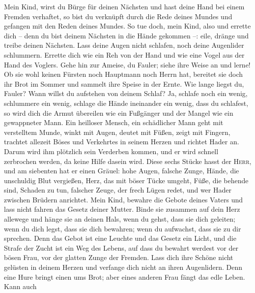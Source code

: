  Mein Kind, wirst du Bürge für deinen Nächsten und hast
deine Hand bei einem Fremden verhaftet,  so bist du
verknüpft durch die Rede deines Mundes und gefangen mit den Reden deines
Mundes.  So tue doch, mein Kind, also und errette dich --
denn du bist deinem Nächsten in die Hände gekommen --: eile, dränge und
treibe deinen Nächsten.  Lass deine Augen nicht schlafen,
noch deine Augenlider schlummern.  Errette dich wie ein
Reh von der Hand und wie eine Vogel aus der Hand des Voglers.
 Gehe hin zur Ameise, du Fauler; siehe ihre Weise an und
lerne!  Ob sie wohl keinen Fürsten noch Hauptmann noch
Herrn hat,  bereitet sie doch ihr Brot im Sommer und
sammelt ihre Speise in der Ernte.  Wie lange liegst du,
Fauler? Wann willst du aufstehen von deinem Schlaf?  Ja,
schlafe noch ein wenig, schlummere ein wenig, schlage die Hände
ineinander ein wenig, dass du schlafest,  so wird dich
die Armut übereilen wie ein Fußgänger und der Mangel wie ein gewappneter
Mann.  Ein heilloser Mensch, ein schädlicher Mann geht
mit verstelltem Munde,  winkt mit Augen, deutet mit
Füßen, zeigt mit Fingern,  trachtet allezeit Böses und
Verkehrtes in seinem Herzen und richtet Hader an.  Darum
wird ihm plötzlich sein Verderben kommen, und er wird schnell zerbrochen
werden, da keine Hilfe dasein wird.  Diese sechs Stücke
hasst der \textsc{Herr}, und am siebenten hat er einen Gräuel:
 hohe Augen, falsche Zunge, Hände, die unschuldig Blut
vergießen,  Herz, das mit böser Tücke umgeht, Füße, die
behende sind, Schaden zu tun,  falscher Zeuge, der frech
Lügen redet, und wer Hader zwischen Brüdern anrichtet. 
Mein Kind, bewahre die Gebote deines Vaters und lass nicht fahren das
Gesetz deiner Mutter.  Binde sie zusammen auf dein Herz
allewege und hänge sie an deinen Hals,  wenn du gehst,
dass sie dich geleiten; wenn du dich legst, dass sie dich bewahren; wenn
du aufwachst, dass sie zu dir sprechen.  Denn das Gebot
ist eine Leuchte und das Gesetz ein Licht, und die Strafe der Zucht ist
ein Weg des Lebens,  auf dass du bewahrt werdest vor der
bösen Frau, vor der glatten Zunge der Fremden.  Lass dich
ihre Schöne nicht gelüsten in deinem Herzen und verfange dich nicht an
ihren Augenlidern.  Denn eine Hure bringt einen ums Brot;
aber eines anderen Frau fängt das edle Leben.  Kann auch
